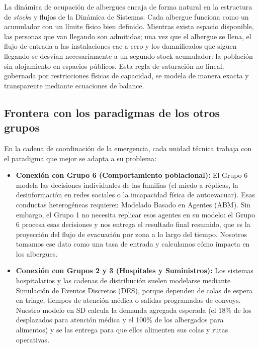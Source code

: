 \documentclass[10pt,letterpaper]{article}
\begin{document}
La dinámica de ocupación de albergues encaja de forma natural en la estructura de \textit{stocks} y flujos de la Dinámica de Sistemas. Cada albergue funciona como un acumulador con un límite físico bien definido. Mientras exista espacio disponible, las personas que van llegando son admitidas; una vez que el albergue se llena, el flujo de entrada a las instalaciones cae a cero y los damnificados que siguen llegando se desvían necesariamente a un segundo stock acumulador: la población sin alojamiento en espacios públicos. Esta regla de saturación no lineal, gobernada por restricciones físicas de capacidad, se modela de manera exacta y transparente mediante ecuaciones de balance.

\subsection{Frontera con los paradigmas de los otros grupos}
En la cadena de coordinación de la emergencia, cada unidad técnica trabaja con el paradigma que mejor se adapta a su problema:

\begin{itemize}
    \item \textbf{Conexión con Grupo 6 (Comportamiento poblacional):} El Grupo 6 modela las decisiones individuales de las familias (el miedo a réplicas, la desinformación en redes sociales o la incapacidad física de autoevacuar). Esas conductas heterogéneas requieren Modelado Basado en Agentes (ABM). Sin embargo, el Grupo 1 no necesita replicar esos agentes en su modelo: el Grupo 6 procesa esas decisiones y nos entrega el resultado final resumido, que es la proyección del flujo de evacuación por zona a lo largo del tiempo. Nosotros tomamos ese dato como una tasa de entrada y calculamos cómo impacta en los albergues.
    \item \textbf{Conexión con Grupos 2 y 3 (Hospitales y Suministros):} Los sistemas hospitalarios y las cadenas de distribución suelen modelarse mediante Simulación de Eventos Discretos (DES), porque dependen de colas de espera en triage, tiempos de atención médica o salidas programadas de convoys. Nuestro modelo en SD calcula la demanda agregada esperada (el 18\% de los desplazados para atención médica y el 100\% de los albergados para alimentos) y se las entrega para que ellos alimenten sus colas y rutas operativas.
\end{itemize}

\end{document}

